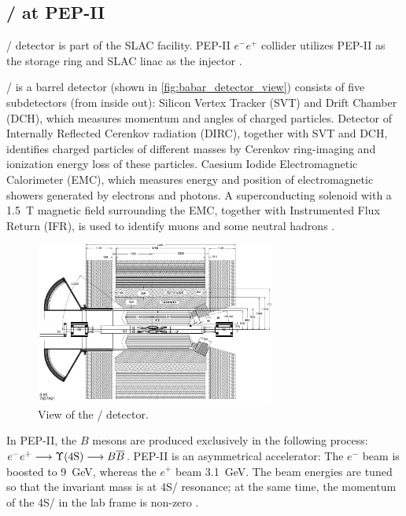 \subsection{\BaBar/ at PEP-II}
\BaBar/ detector is part of the SLAC facility.
PEP-II $e^- e^+$ collider utilizes PEP-II as the storage ring and SLAC linac as
the injector \cite{Harrison:1998yr}.

\BaBar/ is a barrel detector (shown in \autoref{fig:babar_detector_view})
consists of five subdetectors (from inside out):
Silicon Vertex Tracker (SVT) and Drift Chamber (DCH), which measures momentum
and angles of charged particles.
Detector of Internally
Reflected Cerenkov radiation (DIRC), together with SVT and DCH, identifies
charged particles of different masses by Cerenkov ring-imaging and ionization
energy loss of these particles.
Caesium Iodide Electromagnetic Calorimeter (EMC), which measures energy and
position of electromagnetic showers generated by electrons and photons.
A superconducting solenoid with a \SI{1.5}{T} magnetic field surrounding the
EMC, together with Instrumented Flux Return (IFR), is used to identify muons and
some neutral hadrons \cite{Lees:2013uzd}.

\begin{figure}[ht]
    \centering
    \includegraphics[width=0.7\textwidth]{figs/babar_detector_view.pdf}
    \caption{
        View of the \BaBar/ detector.
    }
    \label{fig:babar_detector_view}
\end{figure}

In PEP-II, the $B$ mesons are produced exclusively in the following process:
$e^- e^+ \longrightarrow \Y4S/ \longrightarrow B \overline{B}$.
PEP-II is an asymmetrical accelerator: The $e^-$ beam is boosted to \SI{9}{GeV},
whereas the $e^+$ beam \SI{3.1}{GeV}.
The beam energies are tuned so that the invariant mass is at \Y4S/ resonance;
at the same time, the momentum of the \Y4S/ in the lab frame is
non-zero \cite{Harrison:1998yr}.

